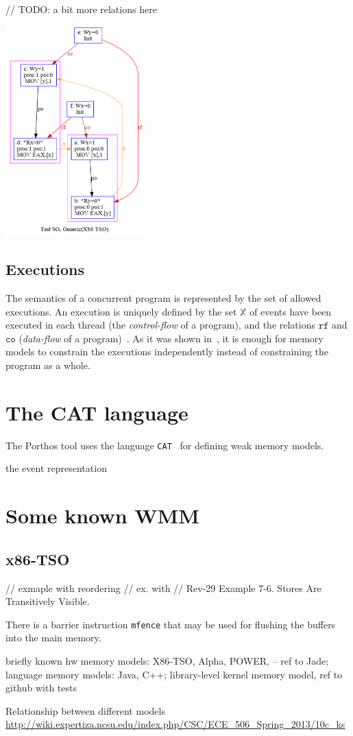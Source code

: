 // TODO: a bit more relations here

\includegraphics[width=0.4\textwidth]{img/my/simple_wmm_x86.png}
\label{simple_wmm_x86_pic}

\subsection{Executions}
\label{ch:wmm:model:executions}

The semantics of a concurrent program is represented by the set of allowed executions.
An execution is uniquely defined by the set $\mathbb{X}$ of events have been executed in each thread (the \textit{control-flow} of a program), and the relations $\mathtt{rf}$ and $\mathtt{co}$ (\textit{data-flow} of a program)~\cite{alglave2010shared}. As it was shown in~\cite{wickerson2017automatically}, it is enough for memory models to constrain the executions independently instead of constraining the program as a whole.

\section{The CAT language}

The Porthos tool uses the language \texttt{CAT}~\cite{alglave2016syntax} for defining weak memory models.

the event representation

\section{Some known WMM}

\subsection{x86-TSO}
\label{ch:wmm:x86}
// exmaple with reordering
// ex. with 
// Rev-29 Example 7-6. Stores Are Transitively Visible. %

There is a barrier instruction \texttt{mfence} that may be used for flushing the buffers into the main memory.

briefly known hw memory models: X86-TSO, Alpha, POWER, -- ref to Jade;
language memory models: Java, C++;
library-level kernel memory model, ref to github with tests

Relationship between different models \url{http://wiki.expertiza.ncsu.edu/index.php/CSC/ECE_506_Spring_2013/10c_ks}
